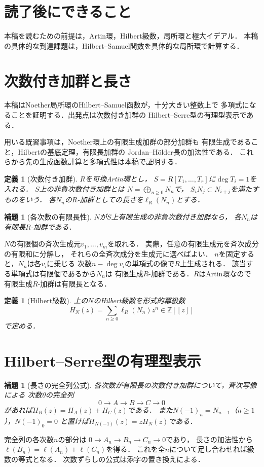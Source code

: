 \documentclass[a5paper,10pt,onecolumn]{jsarticle}
\makeatletter
\theoremstyle{mathnotetheorem}
\newtheorem{definition}[theorem]{定義}
\newtheorem{lemma}[theorem]{補題}
\renewcommand{\proofname}{証明}
\renewenvironment{proof}[1][\proofname]{%
  \par\pushQED{\qed}\normalfont\topsep4\p@\@plus2\p@\relax
  \trivlist\item[\hskip\labelsep\bfseries #1]\ignorespaces
}{\popQED\endtrivlist\@endpefalse}
\makeatother
\begin{document}
\section*{読了後にできること}
本稿を読むための前提は，Artin環，Hilbert級数，局所環と極大イデアル．
本稿の具体的な到達課題は，Hilbert--Samuel関数を具体的な局所環で計算する．

\section{次数付き加群と長さ}
本稿はNoether局所環のHilbert--Samuel函数が，十分大きい整数上で
多項式になることを証明する．出発点は次数付き加群の
Hilbert--Serre型の有理型表示である．

用いる既習事項は，Noether環上の有限生成加群の部分加群も
有限生成であること，Hilbertの基底定理，有限長加群の
Jordan--H\"older長の加法性である．
これらから先の生成函数計算と多項式性は本稿で証明する．

\begin{definition}[次数付き加群]
$R$を可換Artin環とし，
$S=R[T_1,\ldots,T_r]$に$\deg T_i=1$を入れる．
$S$上の\emph{非負次数付き加群}とは
$N=\bigoplus_{n\ge0}N_n$で，
$S_iN_j\subset N_{i+j}$を満たすものをいう．
各$N_n$の$R$-加群としての長さを$\ell_R(N_n)$とする．
\end{definition}

\begin{lemma}[各次数の有限長性]\label{lem:length}
$N$が$S$上有限生成の非負次数付き加群なら，
各$N_n$は有限長$R$-加群である．
\end{lemma}
\begin{proof}
$N$の有限個の斉次生成元$v_1,\ldots,v_m$を取れる．
実際，任意の有限生成元を斉次成分の有限和に分解し，
それらの全斉次成分を生成元に選べばよい．
$n$を固定すると，$N_n$は各$v_i$に乗じる
次数$n-\deg v_i$の単項式の像で$R$上生成される．
該当する単項式は有限個であるから$N_n$は
有限生成$R$-加群である．$R$はArtin環なので
有限生成$R$-加群は有限長となる．
\end{proof}

\begin{definition}[Hilbert級数]
上の$N$のHilbert級数を形式的冪級数
\[
 H_N(z)=\sum_{n\ge0}\ell_R(N_n)z^n\in\mathbb Z[[z]]
\]
で定める．
\end{definition}

\section{Hilbert--Serre型の有理型表示}
\begin{lemma}[長さの完全列公式]\label{lem:exact}
各次数が有限長の次数付き加群について，斉次写像による
次数0の完全列
\[
 0\longrightarrow A\longrightarrow B\longrightarrow C
 \longrightarrow0
\]
があれば$H_B(z)=H_A(z)+H_C(z)$である．
また$N(-1)_n=N_{n-1}$（$n\ge1$），$N(-1)_0=0$
と置けば$H_{N(-1)}(z)=zH_N(z)$である．
\end{lemma}
\begin{proof}
完全列の各次数$n$の部分は
$0\to A_n\to B_n\to C_n\to0$であり，
長さの加法性から$\ell(B_n)=\ell(A_n)+\ell(C_n)$を得る．
これを全$n$について足し合わせれば級数の等式となる．
次数ずらしの公式は添字の置き換えによる．
\end{proof}
\end{document}
